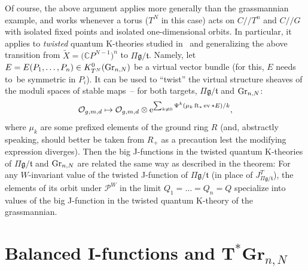 \documentclass[pdftex]{sigma}
\numberwithin{equation}{section}
\def\O{\mathcal O}
\def\CC{\mathbb C}
\def\tilde{\widetilde}
\def\ev{\operatorname{ev}}
\def\ft{\operatorname{ft}}
\begin{document}
\begin{Remark}\label{rmk4}
Of course, the above argument applies more generally than the grassmannian example, and works whenever a torus ($T^N$ in this case) acts on $C//T^n$ and $C//G$ with isolated fixed points and isolated one-dimensional orbits. In particular, it applies to {\em twisted} quantum K-theories studied in~\cite{Givental:perm11} and generalizing the above transition from $\tilde{X}=\big(\CC P^{N-1}\big)^n$ to $\Pi \mathfrak{g}/\mathfrak{t}$. Namely, let $E=E(P_1,\dots,P_n) \in K^0_{T^N}({\rm Gr}_{n,N})$ be a virtual vector bundle (for this, $E$ needs to~be symmetric in $P_i$). It can be used to ``twist'' the virtual structure sheaves of the moduli spaces of stable maps~-- for both targets, $\Pi \mathfrak{g}/\mathfrak{t}$ and ${\rm Gr}_{n,N}$:
\[
\O_{g,m,d} \mapsto \O_{g,m,d}\otimes {\rm e}^{ \sum_{k\neq 0} \Psi^k(\mu_k \ft_*\ev*E)/k},
\]
where $\mu_k$ are some prefixed elements of the ground ring $R$ (and, abstractly speaking, should better be taken from $R_{+}$ as a precaution lest the modifying expression diverges). Then the big J-functions in the twisted quantum K-theories of $\Pi \mathfrak{g}/\mathfrak{t}$ and ${\rm Gr}_{n,N}$ are related the same way as described in the theorem: For any $W$-invariant value of the twisted J-function of $\Pi \mathfrak{g}/\mathfrak{t}$ (in place of $J^T_{\Pi \mathfrak{g}/\mathfrak{t}}$), the elements of its orbit under ${\mathcal P}^W$ in the limit $Q_1=\dots=Q_n=Q$ specialize into values of the big J-function in the twisted quantum K-theory of the grassmannian.
\end{Remark}


\section[Balanced I-functions and T* Gr {n,N}]{Balanced I-functions and ${\boldsymbol T^*{\mathbf{Gr}}_{n,N}}$}\label{Sec5}
\end{document}
